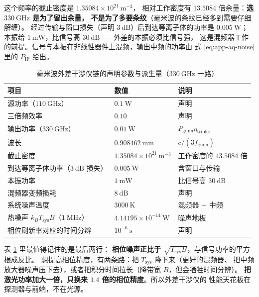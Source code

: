 这个频率的截止密度是 $1.35084\times10^{21}\ \mathrm{m^{-3}}$，
相对工作密度有 $13.5084$ 倍余量：\textbf{选 $330\ \mathrm{GHz}$ 是为了留出余量，
不是为了多要条纹}（毫米波的条纹已经多到需要仔细解缠）。
经过传输与窗口损失（声明 $3\ \mathrm{dB}$）后到达等离子体的功率是 $0.005\ \mathrm{W}$；
本振给 $1\ \mathrm{mW}$，比信号高 $30\ \mathrm{dB}$——外差的本振必须比信号强，
这是混频器工作的前提。信号与本振在非线性器件上混频，输出中频的功率由
式 \eqref{eq:app-aq-noise} 里的 $P_{\mathrm{IF}}$ 给出。

\begin{table}[htbp]
\centering
\small
\caption{毫米波外差干涉仪链的声明参数与派生量（$330\ \mathrm{GHz}$ 一路）}
\label{tab:app-aq-chain}
\setlength{\tabcolsep}{4pt}
\begin{tabular}{p{5.0cm}p{4.0cm}p{4.6cm}}
\toprule
项目 & 数值 & 说明 \\
\midrule
源功率（$110\ \mathrm{GHz}$） & $0.1\ \mathrm{W}$ & 声明 \\
三倍频效率 & $0.10$ & 声明 \\
输出功率（$330\ \mathrm{GHz}$） & $0.01\ \mathrm{W}$ & $P_{\mathrm{gunn}}\eta_{\mathrm{tripler}}$ \\
波长 & $0.908462\ \mathrm{mm}$ & $c/(3f_{\mathrm{gunn}})$ \\
截止密度 & $1.35084\times10^{21}\ \mathrm{m^{-3}}$ & 工作密度的 $13.5084$ 倍 \\
到达等离子体功率（$3\ \mathrm{dB}$ 损失） & $0.005\ \mathrm{W}$ & 含窗口与传输 \\
本振功率 & $1\ \mathrm{mW}$ & 比信号高 $30\ \mathrm{dB}$ \\
混频器变频损耗 & $8\ \mathrm{dB}$ & 声明 \\
系统噪声温度 & $3000\ \mathrm{K}$ & 混频器 $+$ 中频 \\
热噪声 $k_BT_{\mathrm{sys}}B$（$1\ \mathrm{MHz}$） & $4.14195\times10^{-14}\ \mathrm{W}$ & 噪声地板 \\
相位刷新率对应的时间分辨 & $10^{-6}\ \mathrm{s}$ & 声明 \\
\bottomrule
\end{tabular}
\end{table}

表 \ref{tab:app-aq-chain} 里最值得记住的是最后两行：
\textbf{相位噪声正比于 $\sqrt{T_{\mathrm{sys}}B}$}，与信号功率的平方根成反比。
想提高相位精度，有两条路：把 $T_{\mathrm{sys}}$ 降下来（更好的混频器、
把中频放大器噪声压下去），或者把积分时间拉长（降带宽 $B$，但会牺牲时间分辨）。
\textbf{把激光功率加大一倍，只换来 $1.4$ 倍的相位精度}。所以外差干涉仪的
性能天花板在探测器与前端，不在光源。

